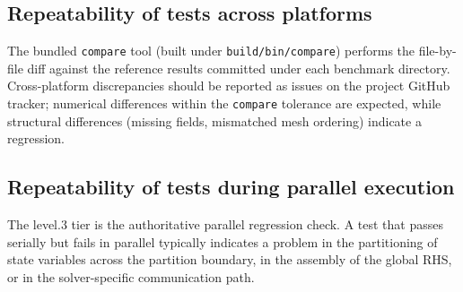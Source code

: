 \subsection{Repeatability of tests across platforms}
\label{sect.repeat.platforms}
The bundled \texttt{compare} tool (built under \texttt{build/bin/compare})
performs the file-by-file diff against the reference results
committed under each benchmark directory.  Cross-platform
discrepancies should be reported as issues on the project GitHub
tracker; numerical differences within the \texttt{compare} tolerance
are expected, while structural differences (missing fields, mismatched
mesh ordering) indicate a regression.

\subsection{Repeatability of tests during parallel execution}
\label{sect.repeat.parallel}
The level.3 tier is the authoritative parallel regression check.  A
test that passes serially but fails in parallel typically indicates a
problem in the partitioning of state variables across the partition
boundary, in the assembly of the global RHS, or in the
solver-specific communication path.
